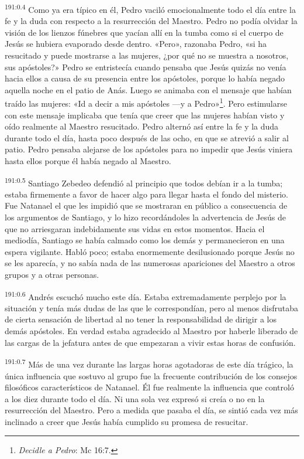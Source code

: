 \par
\textsuperscript{191:0.4} Como ya era típico en él, Pedro vaciló emocionalmente todo el día entre la fe y la duda con respecto a la resurrección del Maestro. Pedro no podía olvidar la visión de los lienzos fúnebres que yacían allí en la tumba como si el cuerpo de Jesús se hubiera evaporado desde dentro. «Pero», razonaba Pedro, «si ha resucitado y puede mostrarse a las mujeres, ¿por qué no se muestra a nosotros, sus apóstoles?» Pedro se entristecía cuando pensaba que Jesús quizás no venía hacia ellos a causa de su presencia entre los apóstoles, porque lo había negado aquella noche en el patio de Anás. Luego se animaba con el mensaje que habían traído las mujeres: «Id a decir a mis apóstoles ---y a Pedro»\footnote{\textit{Decidle a Pedro}: Mc 16:7.}. Pero estimularse con este mensaje implicaba que tenía que creer que las mujeres habían visto y oído realmente al Maestro resucitado. Pedro alternó así entre la fe y la duda durante todo el día, hasta poco después de las ocho, en que se atrevió a salir al patio. Pedro pensaba alejarse de los apóstoles para no impedir que Jesús viniera hasta ellos porque él había negado al Maestro.

\par
\textsuperscript{191:0.5} Santiago Zebedeo defendió al principio que todos debían ir a la tumba; estaba firmemente a favor de hacer algo para llegar hasta el fondo del misterio. Fue Natanael el que les impidió que se mostraran en público a consecuencia de los argumentos de Santiago, y lo hizo recordándoles la advertencia de Jesús de que no arriesgaran indebidamente sus vidas en estos momentos. Hacia el mediodía, Santiago se había calmado como los demás y permanecieron en una espera vigilante. Habló poco; estaba enormemente desilusionado porque Jesús no se les aparecía, y no sabía nada de las numerosas apariciones del Maestro a otros grupos y a otras personas.

\par
\textsuperscript{191:0.6} Andrés escuchó mucho este día. Estaba extremadamente perplejo por la situación y tenía más dudas de las que le correspondían, pero al menos disfrutaba de cierta sensación de libertad al no tener la responsabilidad de dirigir a los demás apóstoles. En verdad estaba agradecido al Maestro por haberle liberado de las cargas de la jefatura antes de que empezaran a vivir estas horas de confusión.

\par
\textsuperscript{191:0.7} Más de una vez durante las largas horas agotadoras de este día trágico, la única influencia que sostuvo al grupo fue la frecuente contribución de los consejos filosóficos característicos de Natanael. Él fue realmente la influencia que controló a los diez durante todo el día. Ni una sola vez expresó si creía o no en la resurrección del Maestro. Pero a medida que pasaba el día, se sintió cada vez más inclinado a creer que Jesús había cumplido su promesa de resucitar.

